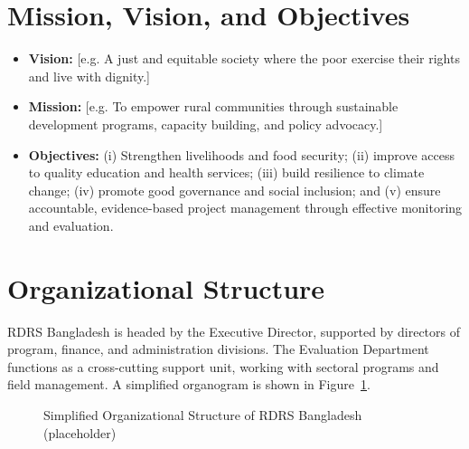 \documentclass[12pt,a4paper]{report}
\begin{document}
\section{Mission, Vision, and Objectives}
\begin{itemize}
    \item \textbf{Vision:} [e.g. A just and equitable society where the
        poor exercise their rights and live with dignity.] %
    \item \textbf{Mission:} [e.g. To empower rural communities through
        sustainable development programs, capacity building, and policy
        advocacy.] %
    \item \textbf{Objectives:} (i) Strengthen livelihoods and food
        security; (ii) improve access to quality education and health
        services; (iii) build resilience to climate change; (iv) promote
        good governance and social inclusion; and (v) ensure accountable,
        evidence-based project management through effective monitoring
        and evaluation.
\end{itemize}

\section{Organizational Structure}
RDRS Bangladesh is headed by the Executive Director, supported by
directors of program, finance, and administration divisions. The
Evaluation Department functions as a cross-cutting support unit,
working with sectoral programs and field management. A simplified
organogram is shown in Figure~\ref{fig:orgchart}.

\begin{figure}[H]
    \centering
    \caption{Simplified Organizational Structure of RDRS Bangladesh (placeholder)}
    \label{fig:orgchart}
\end{figure}
\end{document}
